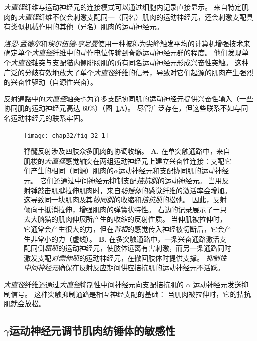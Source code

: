 \textit{大直径}纤维与运动神经元的连接模式可以通过细胞内记录直接显示。
来自特定肌肉的\textit{大直径}纤维不仅会刺激支配同一（同名）肌肉的运动神经元，还会刺激支配具有类似机械作用的其他（异名）肌肉的运动神经元。


\textit{洛恩$\cdot$孟德尔}和\textit{埃尔伍德$\cdot$亨尼曼}使用一种被称为尖峰触发平均的计算机增强技术来确定单个\textit{大直径}纤维中的动作电位传输到脊髓运动神经元群的程度。
他们发现单个\textit{大直径}轴突与支配猫内侧腓肠肌的所有同名运动神经元形成兴奋性突触。
这种广泛的分歧有效地放大了单个\textit{大直径}纤维的信号，导致对它们起源的肌肉产生强烈的兴奋性驱动（自源性兴奋）。


反射通路中的\textit{大直径}轴突也为许多支配协同肌的运动神经元提供兴奋性输入（一些协同肌的运动神经元高达 60\%）（图~\ref{fig:32_1}A）。 
尽管广泛存在，但这些联系不如与同名运动神经元的联系牢固。


\begin{figure}[htbp]
	\centering
	\texttt{[image: chap32/fig\_32\_1]}
	\caption{脊髓反射涉及四肢众多肌肉的协调收缩。
		\textbf{A.} 在单突触通路中，来自肌梭的\textit{大直径}感觉轴突在两组运动神经元上建立兴奋性连接：支配它们产生的相同（同源）肌肉的$ \alpha $运动神经元和支配协同肌的运动神经元。 
		它们还通过中间神经元抑制支配\textit{拮抗肌}的运动神经元。
		当用反射锤敲击肌腱拉伸肌肉时，来自\textit{纺锤体}的感觉纤维的激活率会增加。
		这导致同一块肌肉及其\textit{协同肌}的收缩和\textit{拮抗肌}的松弛。
		因此，反射倾向于抵消拉伸，增强肌肉的弹簧状特性。
		右边的记录展示了一只去大脑猫的肌肉伸展所产生的收缩的反射性质。
		当伸肌被拉伸时，它通常会产生很大的力，但在\textit{背根}的感觉传入神经被切断后，它会产生非常小的力（虚线）\cite{liddell1924reflexes}。
		\textbf{B.} 在多突触通路中，一条兴奋通路激活支配同侧\textit{屈肌}的运动神经元，使肢体远离有害刺激，而另一条通路同时激发支配\textit{对侧伸肌}的运动神经元，在撤回肢体时提供支撑。
		\textit{抑制性中间神经元}确保在反射反应期间供应拮抗肌的运动神经元不活跃\cite{schmidt1989motor}。}
	\label{fig:32_1}
\end{figure}


\textit{大直径}纤维还通过\textit{大直径}抑制性中间神经元向支配拮抗肌的 $ \alpha $ 运动神经元发送抑制信号。
这种突触抑制通路是相互神经支配的基础：
当肌肉被拉伸时，它的拮抗肌就会放松。



\subsection{$ \gamma $运动神经元调节肌肉纺锤体的敏感性}

